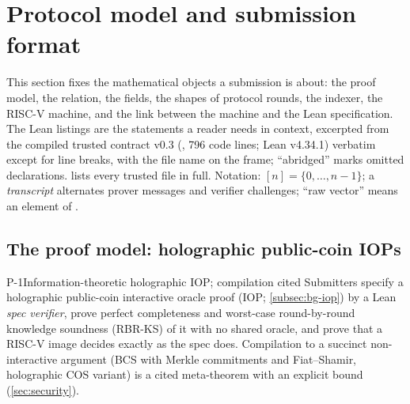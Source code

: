 \section{Protocol model and submission format}\label{sec:protocol}

This section fixes the mathematical objects a submission is about: the proof model, the relation,
the fields, the shapes of protocol rounds, the indexer, the RISC-V machine, and the link between
the machine and the Lean specification. The Lean listings are the statements a reader needs in
context, excerpted from the compiled trusted contract v0.3 (, 796 code
lines; Lean v4.34.1) verbatim except for line breaks, with the file name on the frame;
\enquote{abridged} marks omitted declarations.  lists every trusted
file in full. Notation:
$[n]=\{0,\dots,n-1\}$; a \emph{transcript} alternates prover messages and verifier challenges;
``raw vector'' means an element of .

\subsection{The proof model: holographic public-coin IOPs}\label{subsec:proto-model}

\begin{decision}{P-1}{Information-theoretic holographic IOP; compilation cited}
Submitters specify a holographic public-coin interactive oracle proof (IOP;
\cref{subsec:bg-iop}) by a Lean \emph{spec verifier}, prove perfect completeness and worst-case
round-by-round knowledge soundness (RBR-KS) of it with no shared oracle, and prove that a RISC-V
image decides exactly as the spec does. Compilation to a succinct non-interactive argument (BCS
with Merkle commitments and Fiat--Shamir, holographic COS variant) is a cited meta-theorem with an
explicit bound (\cref{sec:security}).
\end{decision}

